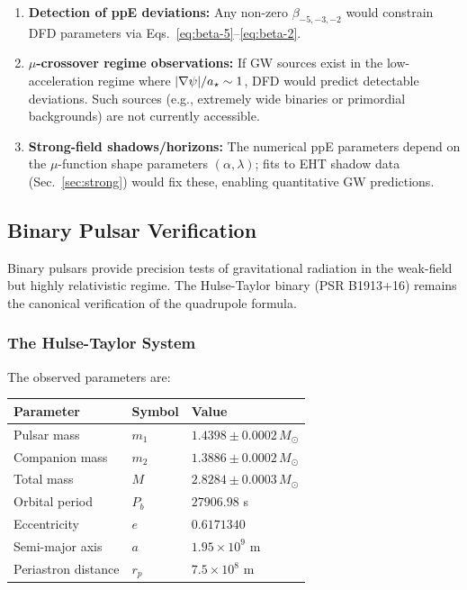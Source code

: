 \begin{enumerate}
\item \textbf{Detection of ppE deviations:} Any non-zero $\beta_{-5,-3,-2}$ would constrain DFD parameters via Eqs.~\eqref{eq:beta-5}--\eqref{eq:beta-2}.

\item \textbf{$\mu$-crossover regime observations:} If GW sources exist in the low-acceleration regime where $|\nabla\psi|/a_\star \sim 1$, DFD would predict detectable deviations. Such sources (e.g., extremely wide binaries or primordial backgrounds) are not currently accessible.

\item \textbf{Strong-field shadows/horizons:} The numerical ppE parameters depend on the $\mu$-function shape parameters $(\alpha, \lambda)$; fits to EHT shadow data (Sec.~\ref{sec:strong}) would fix these, enabling quantitative GW predictions.
\end{enumerate}

\subsection{Binary Pulsar Verification}\label{sec:gw-pulsar}

Binary pulsars provide precision tests of gravitational radiation in the weak-field but highly relativistic regime. The Hulse-Taylor binary (PSR B1913+16) remains the canonical verification of the quadrupole formula.

\subsubsection{The Hulse-Taylor System}\label{sec:gw-ht}

The observed parameters \cite{Weisberg2010} are:

\begin{table}[h]
\centering
\renewcommand{\arraystretch}{1.1}
\begin{tabular}{lll}
\toprule
Parameter & Symbol & Value \\
\midrule
Pulsar mass & $m_1$ & $1.4398 \pm 0.0002\, M_{\odot}$ \\
Companion mass & $m_2$ & $1.3886 \pm 0.0002\, M_{\odot}$ \\
Total mass & $M$ & $2.8284 \pm 0.0003\, M_{\odot}$ \\
Orbital period & $P_b$ & $27906.98$ s \\
Eccentricity & $e$ & $0.6171340$ \\
Semi-major axis & $a$ & $1.95 \times 10^9$ m \\
Periastron distance & $r_p$ & $7.5 \times 10^8$ m \\
\bottomrule
\end{tabular}
\end{table}

